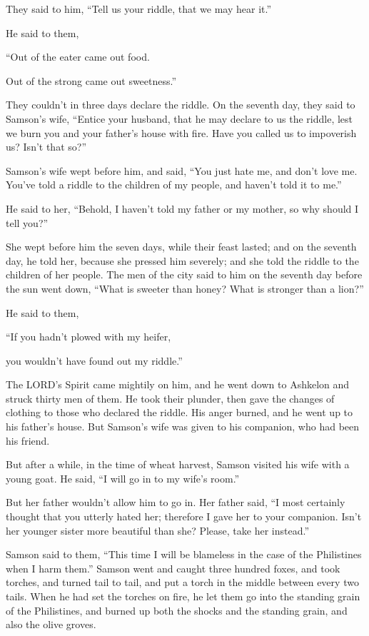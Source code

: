 They said to him, “Tell us your riddle, that we may hear it.”

\myverse{}He said to them,

“Out of the eater came out food.

Out of the strong came out sweetness.”

They couldn’t in three days declare the riddle.
\myverse{}On the seventh day, they said to Samson’s wife, “Entice your husband, that
he may declare to us the riddle, lest we burn you and your father’s house with fire. Have you called us
to impoverish us? Isn’t that so?”

\myverse{}Samson’s wife wept before him, and said, “You just hate me,
and don’t love me. You’ve told a riddle to the children of my people, and haven’t told it to me.”

He said to her, “Behold, I haven’t told my father or my mother, so why should I tell you?”

\myverse{}She wept before him the seven days, while their feast lasted;
and on the seventh day, he told her, because she pressed him severely; and she told the riddle to the
children of her people.
\myverse{}The men of the city said to him on the seventh day before the sun went down,
“What is sweeter than honey? What is stronger than a lion?”

He said to them,

“If you hadn’t plowed with my heifer,

you wouldn’t have found out my riddle.”

\myverse{}The LORD’s Spirit came mightily on him, and he went down to
Ashkelon and struck thirty men of them. He took their plunder, then gave the changes of clothing to those
who declared the riddle. His anger burned, and he went up to his father’s house.
\myverse{}But Samson’s wife was given to his companion, who had been his friend.


\mychapter{} \myverse*{}But after a while, in the time of wheat harvest, Samson visited
his wife with a young goat. He said, “I will go in to my wife’s room.”

But her father wouldn’t allow him to go in.
\myverse{}Her father said, “I most certainly thought that you utterly hated her; therefore
I gave her to your companion. Isn’t her younger sister more beautiful than she? Please, take her instead.”

\myverse{}Samson said to them, “This time I will be blameless in the case
of the Philistines when I harm them.”
\myverse{}Samson went and caught three hundred foxes, and took torches, and turned tail
to tail, and put a torch in the middle between every two tails.
\myverse{}When he had set the torches on fire, he let them go into the standing grain
of the Philistines, and burned up both the shocks and the standing grain, and also the olive groves.

